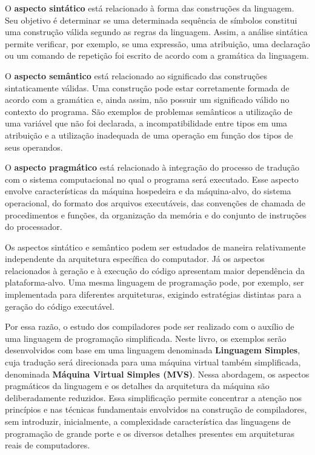 \documentclass[
  brazilian,
  letterpaper,
]{book}
\theoremstyle{plain}
\theoremstyle{definition}
\theoremstyle{remark}
\begin{document}
O \textbf{aspecto sintático} está relacionado à forma das construções da
linguagem. Seu objetivo é determinar se uma determinada sequência de
símbolos constitui uma construção válida segundo as regras da linguagem.
Assim, a análise sintática permite verificar, por exemplo, se uma
expressão, uma atribuição, uma declaração ou um comando de repetição foi
escrito de acordo com a gramática da linguagem.

O \textbf{aspecto semântico} está relacionado ao significado das
construções sintaticamente válidas. Uma construção pode estar
corretamente formada de acordo com a gramática e, ainda assim, não
possuir um significado válido no contexto do programa. São exemplos de
problemas semânticos a utilização de uma variável que não foi declarada,
a incompatibilidade entre tipos em uma atribuição e a utilização
inadequada de uma operação em função dos tipos de seus operandos.

O \textbf{aspecto pragmático} está relacionado à integração do processo
de tradução com o sistema computacional no qual o programa será
executado. Esse aspecto envolve características da máquina hospedeira e
da máquina-alvo, do sistema operacional, do formato dos arquivos
executáveis, das convenções de chamada de procedimentos e funções, da
organização da memória e do conjunto de instruções do processador.

Os aspectos sintático e semântico podem ser estudados de maneira
relativamente independente da arquitetura específica do computador. Já
os aspectos relacionados à geração e à execução do código apresentam
maior dependência da plataforma-alvo. Uma mesma linguagem de programação
pode, por exemplo, ser implementada para diferentes arquiteturas,
exigindo estratégias distintas para a geração do código executável.

Por essa razão, o estudo dos compiladores pode ser realizado com o
auxílio de uma linguagem de programação simplificada. Neste livro, os
exemplos serão desenvolvidos com base em uma linguagem denominada
\textbf{Linguagem Simples}, cuja tradução será direcionada para uma
máquina virtual também simplificada, denominada \textbf{Máquina Virtual
Simples (MVS)}. Nessa abordagem, os aspectos pragmáticos da linguagem e
os detalhes da arquitetura da máquina são deliberadamente reduzidos.
Essa simplificação permite concentrar a atenção nos princípios e nas
técnicas fundamentais envolvidos na construção de compiladores, sem
introduzir, inicialmente, a complexidade característica das linguagens
de programação de grande porte e os diversos detalhes presentes em
arquiteturas reais de computadores.
\end{document}
